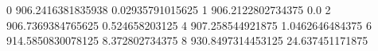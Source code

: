 0 906.2416381835938 0.02935791015625
1 906.2122802734375 0.0
2 906.7369384765625 0.524658203125
4 907.258544921875 1.0462646484375
6 914.5850830078125 8.372802734375
8 930.8497314453125 24.637451171875
